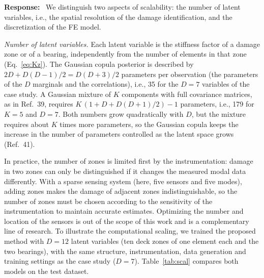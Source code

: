 \documentclass[11pt]{article}
\newenvironment{response}{\par\smallskip\noindent\color{resp}\textbf{Response:}\ }{\par}
\begin{document}
\begin{response}
We distinguish two aspects of scalability: the number of latent variables, i.e., the spatial resolution of the damage
identification, and the discretization of the FE model.

\textit{Number of latent variables.} Each latent variable is the stiffness factor of a damage zone or of a bearing, independently from the number of elements in that zone (Eq.~\eqref{eq:Kz}). 
The Gaussian copula posterior is described by $2D+D(D-1)/2=D(D+3)/2$ parameters per observation (the parameters of
the $D$ marginals and the correlations), i.e., 35 for the $D=7$ variables of the case study. A Gaussian mixture of $K$
components with full covariance matrices, as in Ref.~39, requires $K\,(1+D+D(D+1)/2)-1$ parameters, i.e., 179 for
$K=5$ and $D=7$. Both numbers grow quadratically with $D$, but the mixture requires about $K$ times more parameters, so
the Gaussian copula keeps the increase in the number of parameters controlled as the latent space grows (Ref.~41).

In practice, the number of zones is limited first by
the instrumentation: damage in two zones can only be distinguished if it changes the measured modal data differently.
With a sparse sensing system (here, five sensors and five modes), adding zones makes the damage of adjacent zones
indistinguishable, so the number of zones must be chosen according to the sensitivity of the instrumentation to
maintain accurate estimates. Optimizing the number and location of the sensors is out of the scope of this work and is
a complementary line of research.
To illustrate the computational scaling, we trained the proposed method with $D=12$ latent variables (ten deck zones of
one element each and the two bearings), with the same structure, instrumentation, data generation and training settings
as the case study ($D=7$). Table~\ref{tab:scal} compares both models on the test dataset.


\end{response}
\end{document}
